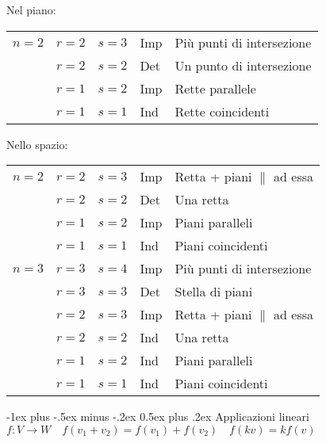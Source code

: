 \documentclass[10pt,landscape]{article}
\makeatletter
\renewcommand{\section}{\@startsection{section}{1}{0mm}%
                                {-1ex plus -.5ex minus -.2ex}%
                                {0.5ex plus .2ex}%
                                {\normalfont\large\bfseries}}
\makeatother
\begin{document}
\begin{multicols}{3}
Nel piano:
\begin{tabular}{@{}lllll@{}}
	$n = 2$ & $r = 2$ & $s = 3$ & Imp & Più punti di intersezione \\
	        & $r = 2$ & $s = 2$ & Det & Un punto di intersezione \\
	        & $r = 1$ & $s = 2$ & Imp & Rette parallele \\
	        & $r = 1$ & $s = 1$ & Ind & Rette coincidenti \\
\end{tabular}
Nello spazio:
\begin{tabular}{@{}lllll@{}}
	$n = 2$ & $r = 2$ & $s = 3$ & Imp & Retta + piani $\parallel$ ad essa \\
			& $r = 2$ & $s = 2$ & Det & Una retta \\
			& $r = 1$ & $s = 2$ & Imp & Piani paralleli \\
			& $r = 1$ & $s = 1$ & Ind & Piani coincidenti \\
	$n = 3$ & $r = 3$ & $s = 4$ & Imp & Più punti di intersezione \\
			& $r = 3$ & $s = 3$ & Det & Stella di piani \\
			& $r = 2$ & $s = 3$ & Imp & Retta + piani $\parallel$ ad essa \\
			& $r = 2$ & $s = 2$ & Ind & Una retta \\
			& $r = 1$ & $s = 2$ & Ind & Piani paralleli \\
			& $r = 1$ & $s = 1$ & Ind & Piani coincidenti \\
\end{tabular}

\section{Applicazioni lineari}
$f: V \rightarrow W \quad f(v_1+v_2) = f(v_1) + f(v_2) \quad f(kv) = kf(v)$


\end{multicols}
\end{document}
